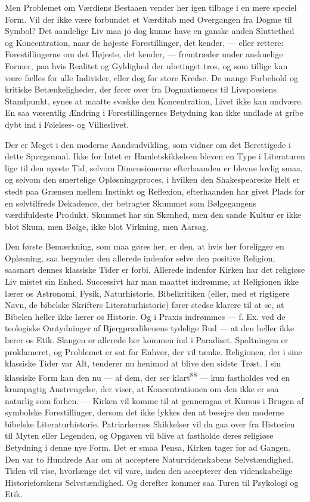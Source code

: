 \documentclass[12pt,a4paper,openany]{book}
\newcommand{\opage}[1]{\marginnote{\footnotesize\textit{[#1]}}}
\begin{document}
Men Problemet om Værdiens Bestaaen vender her igen tilbage i en mere
speciel Form. Vil der ikke være forbundet et Værditab med Overgangen fra
Dogme til Symbol? Det aandelige Liv maa jo dog kunne have en ganske
anden Sluttethed og Koncentration, naar de højeste Forestillinger, det
kender, --- eller
\opage{186}rettere: Forestillingerne om det Højeste, det kender, ---
fremtræder under anskuelige Former, paa hvis Realitet og Gyldighed der
ubetinget tros, og som tillige kan være fælles for alle Individer, eller
dog for store Kredse. De mange Forbehold og kritiske Betænkeligheder,
der fører over fra Dogmatismens til Livspoesiens Standpunkt, synes at
maatte svække den Koncentration, Livet ikke kan undvære. En saa
væsentlig Ændring i Forestillingernes Betydning kan ikke undlade at
gribe dybt ind i Følelses- og Villieslivet.

Der er Meget i den moderne Aandsudvikling, som vidner om det Berettigede
i dette Spørgsmaal. Ikke for Intet er Hamletskikkelsen bleven en Type i
Literaturen lige til den nyeste Tid, selvom Dimensionerne efterhaanden
er blevne lovlig smaa, og selvom den smertelige Opløsningsproces, i
hvilken den Shakespeareske Helt er stedt paa Grænsen mellem Instinkt og
Reflexion, efterhaanden har givet Plads for en selvtilfreds Dekadence,
der betragter Skummet som Bølgegangens værdifuldeste Produkt. Skummet
har sin Skønhed, men den sande Kultur er ikke blot Skum, men Bølge, ikke
blot Virkning, men Aarsag.

Den første Bemærkning, som maa gøres her, er den, at hvis her foreligger
en Opløsning, saa begynder den allerede indenfor selve den positive
Religion, saasnart dennes klassiske Tider er forbi. Allerede indenfor
Kirken har det religiøse Liv mistet sin Enhed. Successivt har man
maattet indrømme, at Religionen ikke lærer os Astronomi, Fysik,
Naturhistorie. Bibelkritiken (eller, med et rigtigere Navn, de bibelske
Skrifters Literaturhistorie) fører stedse klarere til at se, at Bibelen
heller ikke lærer os Historie. Og i Praxis indrømmes --- f. Ex. ved de
teologiske Omtydninger af Bjergprædikenens tydelige Bud --- at den
heller ikke lærer os Etik. Slangen er allerede her kommen ind i
Paradiset. Spaltningen er proklameret, og Problemet er sat for Enhver,
der vil tænke. Religionen, der i sine klassiske Tider var Alt, tenderer
nu henimod at blive den sidste Trøst. I sin klassiske Form kan den nu
--- af dem, der ser klart\textsuperscript{88} --- kun fastholdes ved en
krampagtig Anstrengelse, der viser, at Koncentrationen om den ikke er
saa naturlig som forhen. --- Kirken vil komme til at gennemgaa et Kursus
i Brugen af symbolske Forestillinger, dersom det ikke lykkes den at
besejre den moderne bibelske Literaturhistorie. Patriarkernes Skikkelser
vil
\opage{187}da gaa over fra Historien til Myten eller Legenden, og
Opgaven vil blive at fastholde deres religiøse Betydning i denne nye
Form. Det er smaa Pensa, Kirken tager for ad Gangen. Den var to Hundrede
Aar om at acceptere Naturvidenskabens Selvstændighed. Tiden vil vise,
hvorlænge det vil vare, inden den accepterer den videnskabelige
Historieforskens Selvstændighed. Og derefter kommer saa Turen til
Psykologi og Etik.
\end{document}

